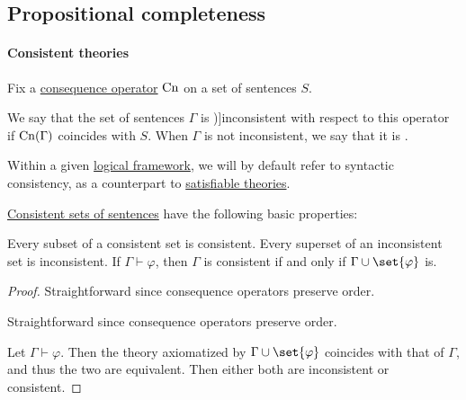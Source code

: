 \subsection{Propositional completeness}\label{subsec:propositional_completeness}

\paragraph{Consistent theories}

\begin{definition}\label{def:consistent_set_of_sentences}
  Fix a \hyperref[def:consequence_operator]{consequence operator} \( \op{Cn} \) on a set of sentences \( S \).

  We say that the set of sentences \( \Gamma \) is \term[ru=противоречивое (множество формул) (\cite[def. 1.3.15]{Герасимов2011})]{inconsistent} with respect to this operator if \( \op{Cn}(\Gamma) \) coincides with \( S \). When \( \Gamma \) is not inconsistent, we say that it is .
\end{definition}
\begin{comments}
  \item Within a given \hyperref[def:logical_framework]{logical framework}, we will by default refer to syntactic consistency, as a counterpart to \hyperref[def:satisfiable_set_of_sentences]{satisfiable theories}.
\end{comments}

\begin{proposition}\label{thm:def:consistent_set_of_sentences}
  \hyperref[def:consistent_set_of_sentences]{Consistent sets of sentences} have the following basic properties:
  \begin{thmenum}
     Every subset of a consistent set is consistent.
     Every superset of an inconsistent set is inconsistent.
     If \( \Gamma \vdash \varphi \), then \( \Gamma \) is consistent if and only if \( \Gamma \cup \set{ \varphi } \) is.
  \end{thmenum}
\end{proposition}
\begin{proof}
   Straightforward since consequence operators preserve order.

   Straightforward since consequence operators preserve order.

   Let \( \Gamma \vdash \varphi \). Then the theory axiomatized by \( \Gamma \cup \set{ \varphi } \) coincides with that of \( \Gamma \), and thus the two are equivalent. Then either both are inconsistent or consistent.
\end{proof}

